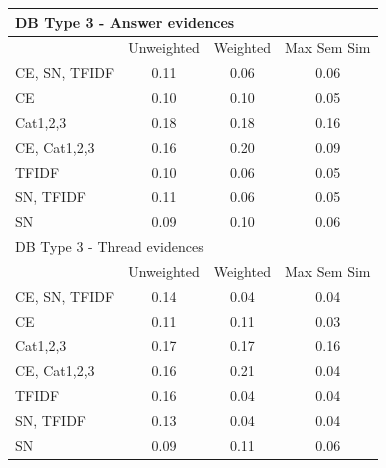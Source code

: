 \documentclass[conference]{IEEEtran}
\begin{document}
\begin{table}[!h]
\begin{tabular}{l||ccc}
		\multicolumn{4}{l}{DB Type 3 - Answer evidences}\\\hline\hline
		& Unweighted & Weighted & Max Sem Sim\\
		CE, SN, TFIDF & 0.11 & 0.06 & 0.06\\
		CE & 0.10 & 0.10 & 0.05\\
		Cat1,2,3 & 0.18 & 0.18 & 0.16\\
		CE, Cat1,2,3 & 0.16 & 0.20 & 0.09\\
		TFIDF & 0.10 & 0.06 & 0.05\\
		SN, TFIDF & 0.11 & 0.06 & 0.05\\
		SN & 0.09 & 0.10 & 0.06\\
		\hline
		
		\multicolumn{4}{l}{DB Type 3 - Thread evidences}\\\hline\hline
		& Unweighted & Weighted & Max Sem Sim\\
		CE, SN, TFIDF & 0.14 & 0.04 & 0.04\\
		CE & 0.11 & 0.11 & 0.03\\
		Cat1,2,3 & 0.17 & 0.17 & 0.16\\
		CE, Cat1,2,3 & 0.16 & 0.21 & 0.04\\
		TFIDF & 0.16 & 0.04 & 0.04\\
		SN, TFIDF & 0.13 & 0.04 & 0.04\\
		SN & 0.09 & 0.11 & 0.06\\
		\hline
		
	\end{tabular}
\end{table}
\end{document}
